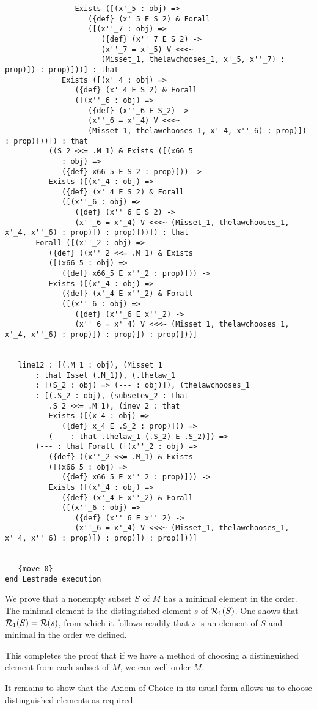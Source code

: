\documentclass{article}
\begin{document}
\begin{verbatim}
                Exists ([(x'_5 : obj) => 
                   ({def} (x'_5 E S_2) & Forall 
                   ([(x''_7 : obj) => 
                      ({def} (x''_7 E S_2) -> 
                      (x''_7 = x'_5) V <<<~ 
                      (Misset_1, thelawchooses_1, x'_5, x''_7) : prop)]) : prop)]))] : that 
             Exists ([(x'_4 : obj) => 
                ({def} (x'_4 E S_2) & Forall 
                ([(x''_6 : obj) => 
                   ({def} (x''_6 E S_2) -> 
                   (x''_6 = x'_4) V <<<~ 
                   (Misset_1, thelawchooses_1, x'_4, x''_6) : prop)]) : prop)]))]) : that 
          ((S_2 <<= .M_1) & Exists ([(x66_5 
             : obj) => 
             ({def} x66_5 E S_2 : prop)])) -> 
          Exists ([(x'_4 : obj) => 
             ({def} (x'_4 E S_2) & Forall 
             ([(x''_6 : obj) => 
                ({def} (x''_6 E S_2) -> 
                (x''_6 = x'_4) V <<<~ (Misset_1, thelawchooses_1, x'_4, x''_6) : prop)]) : prop)]))]) : that 
       Forall ([(x''_2 : obj) => 
          ({def} ((x''_2 <<= .M_1) & Exists 
          ([(x66_5 : obj) => 
             ({def} x66_5 E x''_2 : prop)])) -> 
          Exists ([(x'_4 : obj) => 
             ({def} (x'_4 E x''_2) & Forall 
             ([(x''_6 : obj) => 
                ({def} (x''_6 E x''_2) -> 
                (x''_6 = x'_4) V <<<~ (Misset_1, thelawchooses_1, x'_4, x''_6) : prop)]) : prop)]) : prop)]))]


   line12 : [(.M_1 : obj), (Misset_1 
       : that Isset (.M_1)), (.thelaw_1 
       : [(S_2 : obj) => (--- : obj)]), (thelawchooses_1 
       : [(.S_2 : obj), (subsetev_2 : that 
          .S_2 <<= .M_1), (inev_2 : that 
          Exists ([(x_4 : obj) => 
             ({def} x_4 E .S_2 : prop)])) => 
          (--- : that .thelaw_1 (.S_2) E .S_2)]) => 
       (--- : that Forall ([(x''_2 : obj) => 
          ({def} ((x''_2 <<= .M_1) & Exists 
          ([(x66_5 : obj) => 
             ({def} x66_5 E x''_2 : prop)])) -> 
          Exists ([(x'_4 : obj) => 
             ({def} (x'_4 E x''_2) & Forall 
             ([(x''_6 : obj) => 
                ({def} (x''_6 E x''_2) -> 
                (x''_6 = x'_4) V <<<~ (Misset_1, thelawchooses_1, x'_4, x''_6) : prop)]) : prop)]) : prop)]))]


   {move 0}
end Lestrade execution
\end{verbatim}

We prove that a nonempty subset $S$ of $M$ has a minimal element in the order.  The minimal element is the distinguished element $s$ of ${\cal R}_1(S)$.  One shows
that ${\cal R}_1(S) = {\cal R}(s)$, from which it follows readily that $s$ is an element of $S$ and minimal in the order we defined.

This completes the proof that if we have a method of choosing a distinguished element from each subset of $M$, we can well-order $M$.

It remains to show that the Axiom of Choice in its usual form allows us to choose distinguished elements as required.
\end{document}
